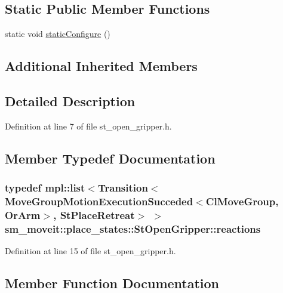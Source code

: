 \subsection*{Static Public Member Functions}
\begin{DoxyCompactItemize}
\item 
static void \hyperlink{structsm__moveit_1_1place__states_1_1StOpenGripper_a3a7ab2224ad0ca4c1e88d8432b0f37bf}{static\+Configure} ()
\end{DoxyCompactItemize}
\subsection*{Additional Inherited Members}


\subsection{Detailed Description}


Definition at line 7 of file st\+\_\+open\+\_\+gripper.\+h.



\subsection{Member Typedef Documentation}
\subsubsection[{\texorpdfstring{reactions}{reactions}}]{\setlength{\rightskip}{0pt plus 5cm}typedef mpl\+::list$<$Transition$<${\bf Move\+Group\+Motion\+Execution\+Succeded}$<${\bf Cl\+Move\+Group}, {\bf Or\+Arm}$>$, {\bf St\+Place\+Retreat}$>$ $>$ {\bf sm\+\_\+moveit\+::place\+\_\+states\+::\+St\+Open\+Gripper\+::reactions}}\hypertarget{structsm__moveit_1_1place__states_1_1StOpenGripper_ad94ebdd7a2c49beba54325e2bd5c5ee5}{}\label{structsm__moveit_1_1place__states_1_1StOpenGripper_ad94ebdd7a2c49beba54325e2bd5c5ee5}


Definition at line 15 of file st\+\_\+open\+\_\+gripper.\+h.



\subsection{Member Function Documentation}
